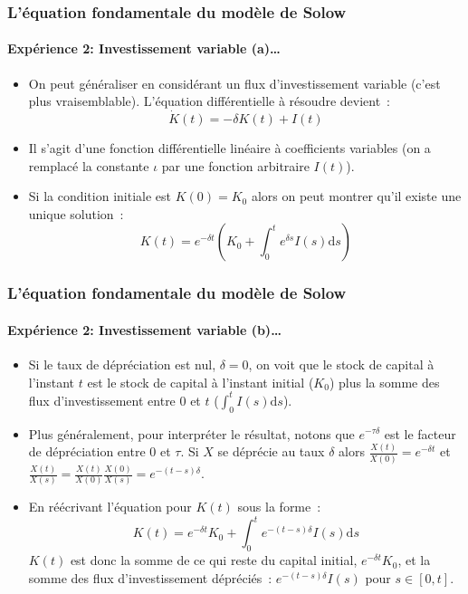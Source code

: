 \documentclass[10pt,notheorems]{beamer}
\theoremstyle{plain}
\theoremstyle{definition} %
\begin{document}
\begin{frame}
  \frametitle{L'équation fondamentale du modèle de Solow}
  \framesubtitle{Expérience 2: Investissement variable (a)\ldots}

  \begin{itemize}
  \item On peut généraliser en considérant un flux d'investissement variable (c'est plus vraisemblable). L'équation différentielle à résoudre devient~:
    \[
      \dot K(t) = -\delta K(t) + I(t)
    \]

    \bigskip

  \item Il s'agit d'une fonction différentielle linéaire à coefficients variables (on a remplacé la constante $\iota$ par une fonction arbitraire $I(t)$).\newline


  \item Si la condition initiale est $K(0)=K_0$ alors on peut montrer qu'il existe une unique solution~:
    \[
      K(t) = e^{-\delta t}\left(K_0 + \int_0^te^{\delta s}I(s)\mathrm ds\right)
    \]
  \end{itemize}

\end{frame}


\begin{frame}
  \frametitle{L'équation fondamentale du modèle de Solow}
  \framesubtitle{Expérience 2: Investissement variable (b)\ldots}

  \begin{itemize}

  \item Si le taux de dépréciation est nul, $\delta=0$, on voit que le stock de capital à l'instant $t$ est le stock de capital à l'instant initial ($K_0$) plus la somme des flux d'investissement entre 0 et $t$ ($\int_0^tI(s)\mathrm ds$).\newline

  \item Plus généralement, pour interpréter le résultat, notons que $e^{-\tau \delta}$ est le facteur de dépréciation entre 0 et $\tau$. Si $X$ se déprécie au taux $\delta$ alors $\frac{X(t)}{X(0)}=e^{-\delta t}$ et $\frac{X(t)}{X(s)} = \frac{X(t)}{X(0)}\frac{X(0)}{X(s)} = e^{-(t-s)\delta}$.\newline

  \item En réécrivant l'équation pour $K(t)$ sous la forme~:
    \[
      K(t) = e^{-\delta t}K_0 + \int_0^te^{-(t-s)\delta}I(s)\mathrm ds
    \]
    $K(t)$ est donc la somme de ce qui reste du capital initial, $e^{-\delta t}K_0$, et la somme des flux d'investissement dépréciés~: $e^{-(t-s)\delta}I(s)$ pour $s\in[0,t]$.
  \end{itemize}

\end{frame}
\end{document}
